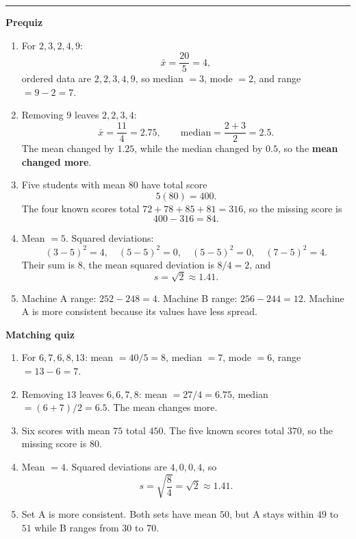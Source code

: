 \documentclass[10pt]{article}
\newcommand{\modulekey}[2]{\clearpage{\Large\bfseries\textcolor{olive}{Module #1: #2 — Answer Key}}\par\textcolor{gold}{\rule{\linewidth}{1.2pt}}\par}
\begin{document}
\modulekey{3}{Basic Statistics}
\textbf{Prequiz}
\begin{enumerate}
\item For \(2,3,2,4,9\):
\[
\bar x=\frac{20}{5}=\boxed4,
\]
ordered data are \(2,2,3,4,9\), so median \(=\boxed3\), mode \(=\boxed2\), and range \(=9-2=\boxed7\).
\item Removing \(9\) leaves \(2,2,3,4\):
\[
\bar x=\frac{11}{4}=\boxed{2.75},\qquad \text{median}=\frac{2+3}{2}=\boxed{2.5}.
\]
The mean changed by \(1.25\), while the median changed by \(0.5\), so the \textbf{mean changed more}.
\item Five students with mean \(80\) have total score
\[
5(80)=400.
\]
The four known scores total \(72+78+85+81=316\), so the missing score is
\[
400-316=\boxed{84}.
\]
\item Mean \(=5\). Squared deviations:
\[
(3-5)^2=4,\quad (5-5)^2=0,\quad (5-5)^2=0,\quad (7-5)^2=4.
\]
Their sum is \(8\), the mean squared deviation is \(8/4=2\), and
\[
s=\sqrt2\approx\boxed{1.41}.
\]
\item Machine A range: \(252-248=\boxed4\). Machine B range: \(256-244=\boxed{12}\). Machine A is more consistent because its values have less spread.
\end{enumerate}

\textbf{Matching quiz}
\begin{enumerate}
\item For \(6,7,6,8,13\): mean \(=40/5=\boxed8\), median \(=\boxed7\), mode \(=\boxed6\), range \(=13-6=\boxed7\).
\item Removing \(13\) leaves \(6,6,7,8\): mean \(=27/4=\boxed{6.75}\), median \(=(6+7)/2=\boxed{6.5}\). The mean changes more.
\item Six scores with mean \(75\) total \(450\). The five known scores total \(370\), so the missing score is \(\boxed{80}\).
\item Mean \(=4\). Squared deviations are \(4,0,0,4\), so
\[
s=\sqrt{\frac84}=\sqrt2\approx\boxed{1.41}.
\]
\item Set A is more consistent. Both sets have mean \(50\), but A stays within \(49\) to \(51\) while B ranges from \(30\) to \(70\).
\end{enumerate}
\end{document}
